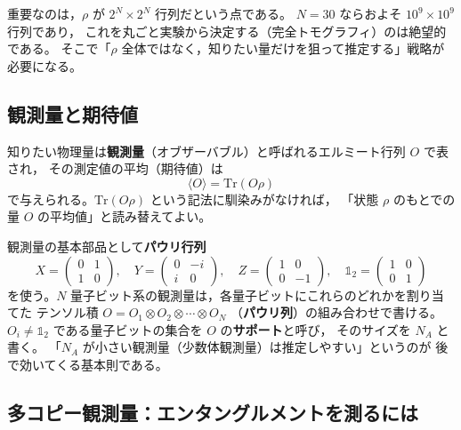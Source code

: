 \documentclass[11pt]{ltjsarticle}
\newcommand{\Tr}{\mathrm{Tr}}
\newcommand{\id}{\mathbb{1}}
\begin{document}
重要なのは，$\rho$ が $2^N \times 2^N$ 行列だという点である。
$N=30$ ならおよそ $10^9 \times 10^9$ 行列であり，
これを丸ごと実験から決定する（完全トモグラフィ）のは絶望的である。
そこで「$\rho$ 全体ではなく，知りたい量だけを狙って推定する」戦略が必要になる。

\subsection{観測量と期待値}

知りたい物理量は\textbf{観測量}（オブザーバブル）と呼ばれるエルミート行列 $O$ で表され，
その測定値の平均（期待値）は
\begin{equation}
  \langle O \rangle = \Tr(O\rho)
\end{equation}
で与えられる。$\Tr(O\rho)$ という記法に馴染みがなければ，
「状態 $\rho$ のもとでの量 $O$ の平均値」と読み替えてよい。

観測量の基本部品として\textbf{パウリ行列}
\begin{equation}
  X=\begin{pmatrix}0&1\\1&0\end{pmatrix},\quad
  Y=\begin{pmatrix}0&-i\\i&0\end{pmatrix},\quad
  Z=\begin{pmatrix}1&0\\0&-1\end{pmatrix},\quad
  \id_2=\begin{pmatrix}1&0\\0&1\end{pmatrix}
\end{equation}
を使う。$N$ 量子ビット系の観測量は，各量子ビットにこれらのどれかを割り当てた
テンソル積 $O = O_1 \otimes O_2 \otimes \cdots \otimes O_N$
（\textbf{パウリ列}）の組み合わせで書ける。
$O_i \neq \id_2$ である量子ビットの集合を $O$ の\textbf{サポート}と呼び，
そのサイズを $N_A$ と書く。
「$N_A$ が小さい観測量（少数体観測量）は推定しやすい」というのが
後で効いてくる基本則である。

\subsection{多コピー観測量：エンタングルメントを測るには}
\end{document}

